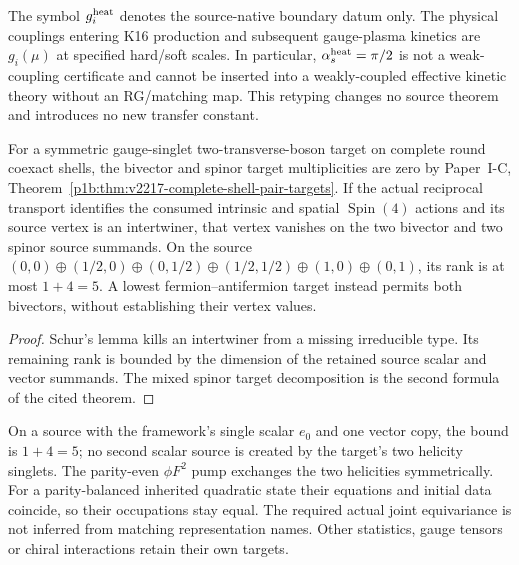 \documentclass[12pt,a4paper]{article}
\begin{document}
\begin{remark}
\label{p7:rem:v262-k16-commonheat-plasma-firewall}
The symbol \(g_i^{\rm heat}\) denotes the source-native boundary datum only.
The physical couplings entering K16 production and subsequent gauge-plasma
kinetics are \(g_i(\mu)\) at specified hard/soft scales.  In particular,
\(\alpha_s^{\rm heat}=\pi/2\) is not a weak-coupling certificate and cannot be
inserted into a weakly-coupled effective kinetic theory without an RG/matching
map.  This retyping changes no source theorem and introduces no new transfer
constant.
\end{remark}

\begin{corollary}
\label{p7:cor:v2217-pair-target-incidence}
For a symmetric gauge-singlet two-transverse-boson target on complete round
coexact shells, the bivector and spinor target multiplicities are zero by
Paper~I-C, Theorem~\ref{p1b:thm:v2217-complete-shell-pair-targets}.
If the actual reciprocal transport identifies the consumed intrinsic and
spatial $\operatorname{Spin}(4)$ actions and its source vertex is an
intertwiner, that vertex vanishes on the two bivector and two spinor source
summands. On the source $(0,0)\oplus(1/2,0)\oplus(0,1/2)\oplus
(1/2,1/2)\oplus(1,0)\oplus(0,1)$, its rank is at most $1+4=5$.
A lowest fermion--antifermion target instead
permits both bivectors, without establishing their vertex values.
\end{corollary}
\begin{proof}
Schur's lemma kills an intertwiner from a missing irreducible type. Its
remaining rank is bounded by the dimension of the retained source scalar
and vector summands. The mixed spinor target decomposition is the second
formula of the cited theorem.
\end{proof}
On a source with the framework's single scalar $e_0$ and one vector copy,
the bound is $1+4=5$; no second scalar source is created by the target's
two helicity singlets. The parity-even $\phi F^2$ pump exchanges the two
helicities symmetrically. For a parity-balanced inherited quadratic state
their equations and initial data coincide, so their occupations stay equal.
The required actual joint equivariance is not inferred from matching
representation names. Other statistics, gauge tensors or chiral interactions
retain their own targets.
\end{document}
